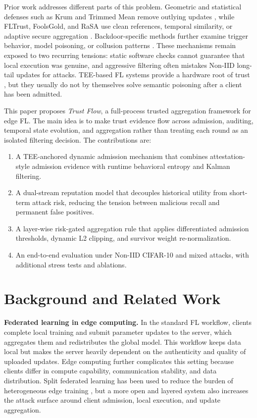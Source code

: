 \documentclass[runningheads,orivec]{llncs}
\newenvironment{tightenumerate}{%
  \begin{enumerate}\setlength{\itemsep}{1pt}\setlength{\parskip}{0pt}\setlength{\parsep}{0pt}}{\end{enumerate}}
\begin{document}
Prior work addresses different parts of this problem. Geometric and statistical defenses such as Krum and Trimmed Mean remove outlying updates \cite{blanchard2017krum,yin2018byzantine}, while FLTrust, FoolsGold, and RaSA use clean references, temporal similarity, or adaptive secure aggregation \cite{cao2021fltrust,fung2020foolsgold,wang2025rasa}. Backdoor-specific methods further examine trigger behavior, model poisoning, or collusion patterns \cite{bagdasaryan2020backdoor,wang2019neuralcleanse,flpurifier,roseagg,shieldfl}. These mechanisms remain exposed to two recurring tensions: static software checks cannot guarantee that local execution was genuine, and aggressive filtering often mistakes Non-IID long-tail updates for attacks. TEE-based FL systems provide a hardware root of trust \cite{zhang2025rppfl,r1_tee_integrity,r5_tee_mitigating,xu2021distributed,lu2025tmt}, but they usually do not by themselves solve semantic poisoning after a client has been admitted.

This paper proposes \emph{Trust Flow}, a full-process trusted aggregation framework for edge FL. The main idea is to make trust evidence flow across admission, auditing, temporal state evolution, and aggregation rather than treating each round as an isolated filtering decision. The contributions are:
\begin{tightenumerate}
    \item A TEE-anchored dynamic admission mechanism that combines attestation-style admission evidence with runtime behavioral entropy and Kalman filtering.
    \item A dual-stream reputation model that decouples historical utility from short-term attack risk, reducing the tension between malicious recall and permanent false positives.
    \item A layer-wise risk-gated aggregation rule that applies differentiated admission thresholds, dynamic L2 clipping, and survivor weight re-normalization.
    \item An end-to-end evaluation under Non-IID CIFAR-10 and mixed attacks, with additional stress tests and ablations.
\end{tightenumerate}

\section{Background and Related Work}

\textbf{Federated learning in edge computing.} In the standard FL workflow, clients complete local training and submit parameter updates to the server, which aggregates them and redistributes the global model. This workflow keeps data local but makes the server heavily dependent on the authenticity and quality of uploaded updates. Edge computing further complicates this setting because clients differ in compute capability, communication stability, and data distribution. Split federated learning has been used to reduce the burden of heterogeneous edge training \cite{parallelsfl}, but a more open and layered system also increases the attack surface around client admission, local execution, and update aggregation.
\end{document}
